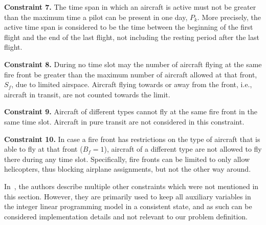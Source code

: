 \textbf{Constraint 7.} The time span in which an aircraft is active must not be greater than the maximum time a pilot can be present in one day, $P_k$.
More precisely, the active time span is considered to be the time between the beginning of the first flight and the end of the last flight, not including the resting period after the last flight.

\textbf{Constraint 8.} During no time slot may the number of aircraft flying at the same fire front be greater than the maximum number of aircraft allowed at that front, $S_f$, due to limited airspace.
Aircraft flying towards or away from the front, i.e., aircraft in transit, are not counted towards the limit.

\textbf{Constraint 9.} Aircraft of different types cannot fly at the same fire front in the same time slot.
Aircraft in pure transit are not considered in this constraint.

\textbf{Constraint 10.} In case a fire front has restrictions on the type of aircraft that is able to fly at that front ($B_{f} = 1$), aircraft of a different type are not allowed to fly there during any time slot.
Specifically, fire fronts can be limited to only allow helicopters, thus blocking airplane assignments, but not the other way around.

In~\cite{SkorinKapov/ILP}, the authors describe multiple other constraints which were not mentioned in this section.
However, they are primarily used to keep all auxiliary variables in the integer linear programming model in a consistent state, and as such can be considered implementation details and not relevant to our problem definition.
